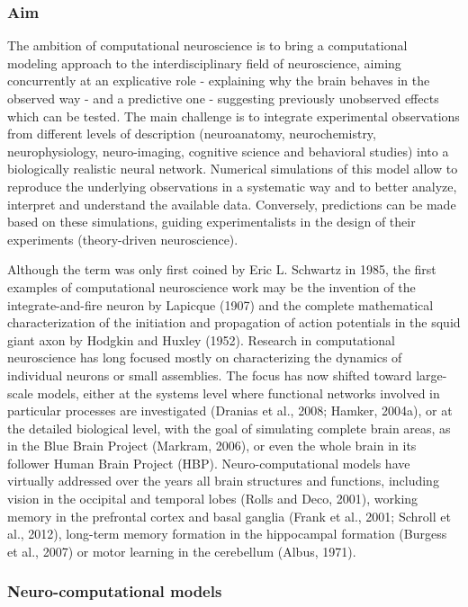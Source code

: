 \documentclass[
  11pt,
  a4paper,
]{scrbook}
\begin{document}
\subsubsection*{Aim}\label{aim}

The ambition of computational neuroscience is to bring a computational
modeling approach to the interdisciplinary field of neuroscience, aiming
concurrently at an explicative role - explaining why the brain behaves
in the observed way - and a predictive one - suggesting previously
unobserved effects which can be tested. The main challenge is to
integrate experimental observations from different levels of description
(neuroanatomy, neurochemistry, neurophysiology, neuro-imaging, cognitive
science and behavioral studies) into a biologically realistic neural
network. Numerical simulations of this model allow to reproduce the
underlying observations in a systematic way and to better analyze,
interpret and understand the available data. Conversely, predictions can
be made based on these simulations, guiding experimentalists in the
design of their experiments (theory-driven neuroscience).

Although the term was only first coined by Eric L. Schwartz in 1985, the
first examples of computational neuroscience work may be the invention
of the integrate-and-fire neuron by Lapicque (1907) and the complete
mathematical characterization of the initiation and propagation of
action potentials in the squid giant axon by Hodgkin and Huxley (1952).
Research in computational neuroscience has long focused mostly on
characterizing the dynamics of individual neurons or small assemblies.
The focus has now shifted toward large-scale models, either at the
systems level where functional networks involved in particular processes
are investigated (Dranias et al., 2008; Hamker, 2004a), or at the
detailed biological level, with the goal of simulating complete brain
areas, as in the Blue Brain Project (Markram, 2006), or even the whole
brain in its follower Human Brain Project (HBP). Neuro-computational
models have virtually addressed over the years all brain structures and
functions, including vision in the occipital and temporal lobes (Rolls
and Deco, 2001), working memory in the prefrontal cortex and basal
ganglia (Frank et al., 2001; Schroll et al., 2012), long-term memory
formation in the hippocampal formation (Burgess et al., 2007) or motor
learning in the cerebellum (Albus, 1971).

\subsubsection*{Neuro-computational
models}\label{neuro-computational-models}
\end{document}
